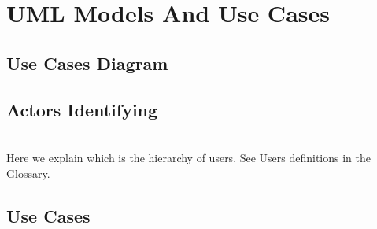 \documentclass[english]{article}
\begin{document}
		
	
\section{UML Models And Use Cases}
	\subsection{Use Cases Diagram}
	\noindent



	\subsection{Actors Identifying}
		\noindent
		\\
	Here we explain which is the hierarchy of users. See Users definitions in the \hyperref[sec:Glossary]{Glossary}.  
	\subsection{Use Cases}
\end{document}
